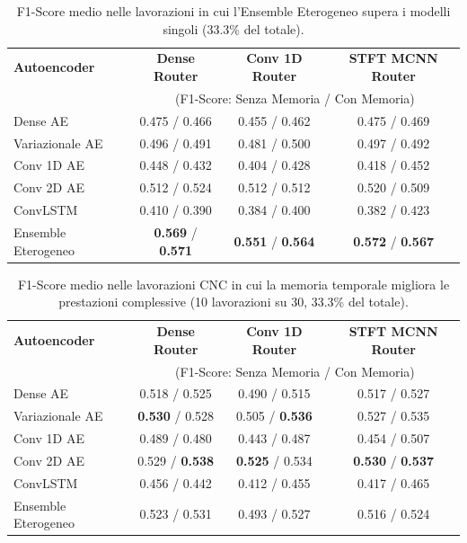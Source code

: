 \begin{table}[H]
	\centering
	\begin{tabular}{lccc}
		\toprule
		\textbf{Autoencoder} & \textbf{Dense Router} & \textbf{Conv 1D Router} & \textbf{STFT MCNN Router} \\
		& \multicolumn{3}{c}{\small (F1-Score: Senza Memoria / Con Memoria)} \\
		\midrule
		Dense AE            & 0.475 / 0.466 & 0.455 / 0.462 & 0.475 / 0.469 \\
		Variazionale AE     & 0.496 / 0.491 & 0.481 / 0.500 & 0.497 / 0.492 \\
		Conv 1D AE          & 0.448 / 0.432 & 0.404 / 0.428 & 0.418 / 0.452 \\
		Conv 2D AE          & 0.512 / 0.524 & 0.512 / 0.512 & 0.520 / 0.509 \\
		ConvLSTM            & 0.410 / 0.390 & 0.384 / 0.400 & 0.382 / 0.423 \\
		Ensemble Eterogeneo & \textbf{0.569} / \textbf{0.571} & \textbf{0.551} / \textbf{0.564} & \textbf{0.572} / \textbf{0.567} \\
		\bottomrule
	\end{tabular}
	\caption{F1-Score medio nelle lavorazioni in cui l'Ensemble Eterogeneo supera i modelli singoli (33.3\% del totale).}
	\label{tab:benchmark_f1_hetero_wins}
\end{table}

\begin{table}[H]
	\centering
	\begin{tabular}{lccc}
		\toprule
		\textbf{Autoencoder} & \textbf{Dense Router} & \textbf{Conv 1D Router} & \textbf{STFT MCNN Router} \\
		& \multicolumn{3}{c}{\small (F1-Score: Senza Memoria / Con Memoria)} \\
		\midrule
		Dense AE            & 0.518 / 0.525 & 0.490 / 0.515 & 0.517 / 0.527 \\
		Variazionale AE     & \textbf{0.530} / 0.528 & 0.505 / \textbf{0.536} & 0.527 / 0.535 \\
		Conv 1D AE          & 0.489 / 0.480 & 0.443 / 0.487 & 0.454 / 0.507 \\
		Conv 2D AE          & 0.529 / \textbf{0.538} & \textbf{0.525} / 0.534 & \textbf{0.530} / \textbf{0.537} \\
		ConvLSTM            & 0.456 / 0.442 & 0.412 / 0.455 & 0.417 / 0.465 \\
		Ensemble Eterogeneo & 0.523 / 0.531 & 0.493 / 0.527 & 0.516 / 0.524 \\
		\bottomrule
	\end{tabular}
	\caption{F1-Score medio nelle lavorazioni CNC in cui la memoria temporale migliora le prestazioni complessive (10 lavorazioni su 30, 33.3\% del totale).}
	\label{tab:benchmark_f1_mem_wins}
\end{table}

